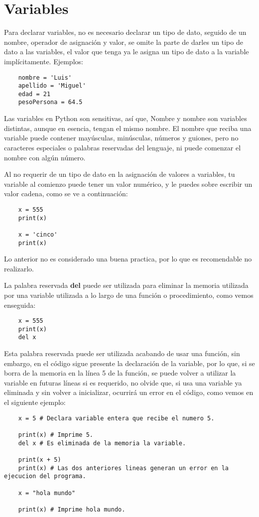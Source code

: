 \section{Variables}

Para declarar variables, no es necesario declarar un tipo de dato, seguido de un nombre, operador de asignación y valor, se omite la parte de darles un tipo de dato a las variables, el valor que tenga ya le asigna un tipo de dato a la variable implícitamente. Ejemplos:
\begin{lstlisting}
    nombre = 'Luis'
    apellido = 'Miguel'
    edad = 21
    pesoPersona = 64.5
\end{lstlisting}

Las variables en Python son sensitivas, así que, Nombre y nombre son variables distintas, aunque en esencia, tengan el mismo nombre. El nombre que reciba una variable puede contener mayúsculas, minúsculas, números y guiones, pero no caracteres especiales o palabras reservadas del lenguaje, ni puede comenzar el nombre con algún número.

Al no requerir de un tipo de dato en la asignación de valores a variables, tu variable al comienzo puede tener un valor numérico, y le puedes sobre escribir un valor cadena, como se ve a continuación:
\begin{lstlisting}
    x = 555
    print(x)

    x = 'cinco'
    print(x)
\end{lstlisting}

Lo anterior no es considerado una buena practica, por lo que es recomendable no realizarlo.

La palabra reservada \textbf{del} puede ser utilizada para eliminar la memoria utilizada por una variable utilizada a lo largo de una función o procedimiento, como vemos enseguida:
\begin{lstlisting}
    x = 555
    print(x)
    del x
\end{lstlisting}

Esta palabra reservada puede ser utilizada acabando de usar una función, sin embargo, en el código sigue presente la declaración de la variable, por lo que, si se borra de la memoria en la línea 5 de la función, se puede volver a utilizar la variable en futuras líneas si es requerido, no olvide que, si usa una variable ya eliminada y sin volver a inicializar, ocurrirá un error en el código, como vemos en el siguiente ejemplo:
\begin{lstlisting}
    x = 5 # Declara variable entera que recibe el numero 5.

    print(x) # Imprime 5.
    del x # Es eliminada de la memoria la variable.

    print(x + 5)
    print(x) # Las dos anteriores lineas generan un error en la ejecucion del programa.

    x = "hola mundo"

    print(x) # Imprime hola mundo.
\end{lstlisting}


